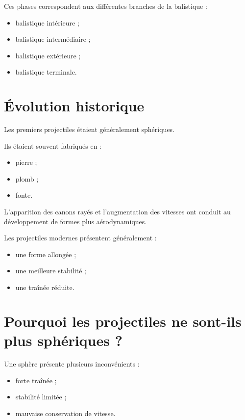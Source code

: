 Ces phases correspondent aux différentes branches de la balistique :

\begin{itemize}
    \item balistique intérieure ;
    \item balistique intermédiaire ;
    \item balistique extérieure ;
    \item balistique terminale.
\end{itemize}

\section{Évolution historique}

Les premiers projectiles étaient généralement sphériques.

Ils étaient souvent fabriqués en :

\begin{itemize}
    \item pierre ;
    \item plomb ;
    \item fonte.
\end{itemize}

L'apparition des canons rayés et l'augmentation des vitesses ont conduit au
développement de formes plus aérodynamiques.

Les projectiles modernes présentent généralement :

\begin{itemize}
    \item une forme allongée ;
    \item une meilleure stabilité ;
    \item une traînée réduite.
\end{itemize}

\section{Pourquoi les projectiles ne sont-ils plus sphériques ?}

Une sphère présente plusieurs inconvénients :

\begin{itemize}
    \item forte traînée ;
    \item stabilité limitée ;
    \item mauvaise conservation de vitesse.
\end{itemize}

